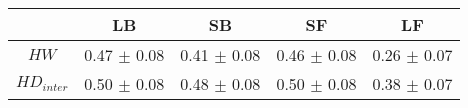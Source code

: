 \begin{tabular}{c c c c c }
\hline
 & LB & SB & SF & LF \\
\hline
$HW$ & 0.47 $\pm$ 0.08 & 0.41 $\pm$ 0.08 & 0.46 $\pm$ 0.08 & 0.26 $\pm$ 0.07 \\
$HD_{inter}$ & 0.50 $\pm$ 0.08 & 0.48 $\pm$ 0.08 & 0.50 $\pm$ 0.08 & 0.38 $\pm$ 0.07 \\
\hline
\end{tabular}